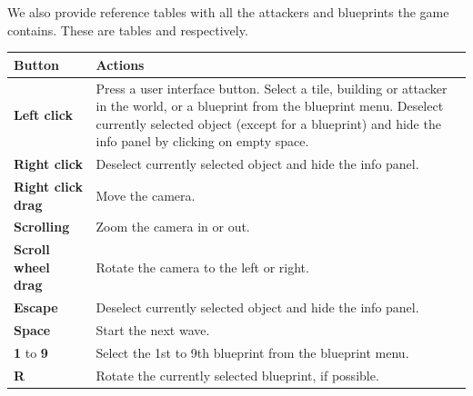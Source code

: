 We also provide reference tables with all the attackers and blueprints the game contains.
These are tables  and  respectively.

\begin{table}[H]
    \centering
    \begin{tabular}{m{}m{}}
        \toprule
        \textbf{Button}                                   & \textbf{Actions}                                                     \\
        \midrule
        \textbf{Left click}                               & Press a user interface button. \vspace{4pt}\newline
        Select a tile, building or attacker in the world, or a blueprint from the blueprint menu. \vspace{4pt}\newline
        Deselect currently selected object (except for a blueprint) and hide the info panel by clicking on empty space.          \\\midrule
        \textbf{Right click}                              & Deselect currently selected object and hide the info panel.          \\\midrule
        \textbf{Right click \newline drag}                & Move the camera.                                                     \\\midrule
        \textbf{Scrolling}                                & Zoom the camera in or out.                                           \\\midrule
        \textbf{Scroll wheel \newline drag}               & Rotate the camera to the left or right.                              \\\midrule
        \textbf{Escape}                                   & Deselect currently selected object and hide the info panel.          \\\midrule
        \textbf{Space}                                    & Start the next wave.                                                 \\\midrule
        \textbf{1} to \textbf{9}                          & Select the 1st to 9th blueprint from the blueprint menu.             \\\midrule
        \textbf{R}                                        & Rotate the currently selected blueprint, if possible.                \\\midrule

\end{tabular}
\end{table}
